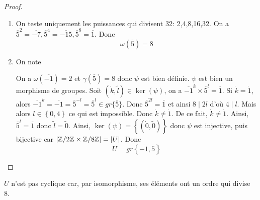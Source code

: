 \begin{proof}
	\phantom{}
	\begin{enumerate}
		\item On teste uniquement les puissances qui divisent 32: 2,4,8,16,32. On a $\overline{5}^{2}=\overline{-7},\overline{5}^{4}=\overline{-15},\overline{5}^{8}=\overline{1}$. Donc 
		\begin{equation}
			\boxed{\omega(\overline{5})=8}
		\end{equation}

		\item On note 
		
		On a $\omega(\overline{-1})=2$ et $\gamma(\overline{5})=8$ donc $\psi$ est bien définie. $\psi$ est bien un morphisme de groupes. Soit $(\dot{k},\tilde{l})\in\ker(\psi)$, on a $\overline{-1}^{k}\times \overline{5}^{l}=\overline{1}$. Si $\dot{k}=\dot{1}$, alors $\overline{-1}^{k}=\overline{-1}=\overline{5}^{-l}=\overline{5}^{l}\in gr\{\overline{5}\}$. Donc $\overline{5}^{2l}=\overline{1}$ et ainsi $8\mid 2l$ d'où $4\mid l$. Mais alors $l\in\left\{0,4\right\}$ ce qui est impossible. Donc $\dot{k}\neq\dot{1}$. De ce fait, $\dot{k}\neq\dot{1}$. Ainsi, $\overline{5}^{l}=\overline{1}$ donc $\tilde{l}=\tilde{0}$. Ainsi, $\ker(\psi)=\left\{(\dot{0},\tilde{0})\right\}$ donc $\psi$ est injective, puis bijective car $\vert\mathbb{Z}/2\mathbb{Z}\times\mathbb{Z}/8\mathbb{Z}\vert=\vert U\vert$. Donc 
		\begin{equation}
			\boxed{U=gr\left\{\overline{-1},\overline{5}\right\}}
		\end{equation}
	\end{enumerate}
\end{proof}

\begin{remark}
	$U$ n'est pas cyclique car, par isomorphisme, ses éléments ont un ordre qui divise 8.
\end{remark}

